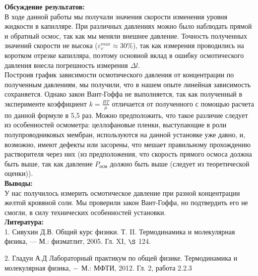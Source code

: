 \documentclass[a4paper, 12pt]{article}%
\begin{document}
\newpage
	\textbf{Обсуждение результатов: }\\
	
	
		В ходе данной работы мы получали значения скорости изменения уровня жидкости в капилляре. При различных давлениях можно было наблюдать прямой и обратный осмос, так как мы меняли внешнее давление. Точность полученных значений скорости не высока ($\varepsilon_v^{max} \approx 30\%$), так как измерения проводились на коротком отрезке капилляра, поэтому основной вклад в ошибку осмотического давления внесла погрешность измерения $\Delta l$.\\
		
		
		Построив график зависимости осмотического давления от концентрации по полученным давлениям, мы получили, что в нашем опыте линейная зависимость сохраняется. Однако закон Вант-Гоффа не выполняется, так как полученный в эксперименте коэффициент $k = \frac{RT}{\mu}$ отличается от полученного с помощью расчета по данной формуле в 5,5 раз. Можно предположить, что такое различие следует из особенностей осмометра: целлофановые пленки, выступающие в роли полупроводниковых мембран, используются на данной установке уже давно, и, возможно, имеют дефекты или засорены, что мешает правильному прохождению растворителя через них (из предположения, что скорость прямого осмоса должна быть выше, так как давление $P_{\text{осм}}$ должно быть выше (следует из теоретической оценки)).\\
		
	\textbf{Выводы: }\\
	
	
	У нас получилось измерить осмотическое давление при разной концентрации желтой кровяной соли. Мы проверили закон Вант-Гоффа, но подтвердить его не смогли, в силу технических особенностей установки.\\
	
	\textbf{Литература: }\\
	
1. Сивухин Д.В. Общий курс физики. Т. II. Термодинамика и молекулярная
физика, — М.: физматлит, 2005. Гл. XI, $\S$ 124.
	
	2. Гладун А.Д Лабораторный практикум по общей физике. Термодинамика и молекулярная физика, $\--$ М.: МФТИ, 2012. Гл. 2, работа 2.2.3 
	
\end{document}
